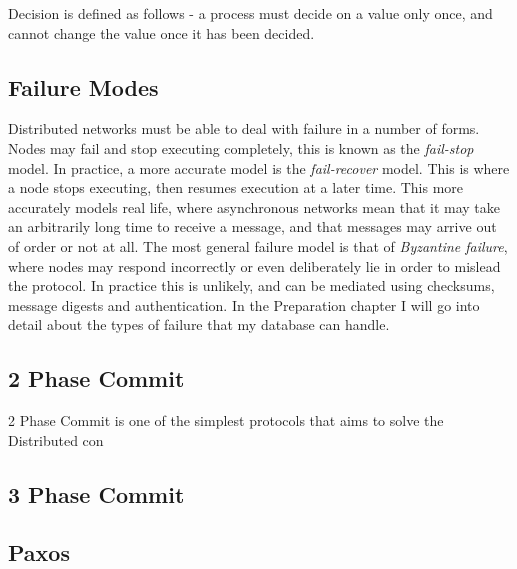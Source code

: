 \documentclass[12pt,twoside,notitlepage]{report}
\begin{document}
Decision is defined as follows - a process must decide on a value only once, and cannot change the
value once it has been decided.

\subsection*{Failure Modes}

Distributed networks must be able to deal with failure in a number of forms. Nodes may fail and
stop executing completely, this is known as the \emph{fail-stop} model. In practice, a more accurate
model is the \emph{fail-recover} model. This is where a node stops executing, then resumes execution
at a later time. This more accurately models real life, where asynchronous networks mean that it
may take an arbitrarily long time to receive a message, and that messages may arrive out of order
or not at all. The most general failure model is that of \emph{Byzantine failure}, where nodes may
respond incorrectly or even deliberately lie in order to mislead the protocol. In practice this is
unlikely, and can be mediated using checksums, message digests and authentication. In the
Preparation chapter I will go into detail about the types of failure that my database can handle.

\subsection*{2 Phase Commit}


2 Phase Commit is one of the simplest protocols that aims to solve the Distributed con

\subsection*{3 Phase Commit}


\subsection*{Paxos}
\end{document}
